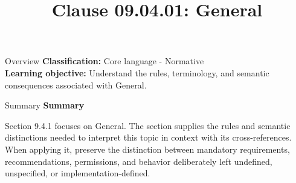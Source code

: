 \documentclass[10pt,letterpaper]{article}
\title{Clause 09.04.01: General}
\author{}
\date{}
\begin{document}
\maketitle
\begin{CornellOverviewBox}{Overview}
\textbf{Classification:} Core language - Normative\\[2pt]
\textbf{Learning objective:} Understand the rules, terminology, and semantic consequences associated with General.
\end{CornellOverviewBox}\begin{CornellSummaryBox}{Summary}
{\sffamily\bfseries\color{Accent} Summary}\par\vspace{3pt}Section 9.4.1 focuses on General. The section supplies the rules and semantic distinctions needed to interpret this topic in context with its cross-references. When applying it, preserve the distinction between mandatory requirements, recommendations, permissions, and behavior deliberately left undefined, unspecified, or implementation-defined.
\end{CornellSummaryBox}
\end{document}
